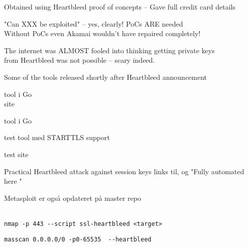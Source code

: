 \documentclass[Screen16to9,17pt]{foils}
\begin{document}
\begin{list2}
\item Obtained using Heartbleed proof of concepts -- Gave full credit card details
\item "Can XXX be exploited" -- yes, clearly! PoCs ARE needed\\
Without PoCs even Akamai wouldn't have repaired completely!
\item The internet was ALMOST fooled into thinking getting private keys\\
 from Heartbleed was not possible -- scary indeed.
\end{list2}


\centerline{Some of the tools released shortly after Heartbleed announcement}
\begin{list2}
\item {} tool i Go\\
site 
\item {} tool i Go
\item {} test tool med STARTTLS support
\item {} test site
\item {} Practical Heartbleed attack against session keys links til,  og "Fully automated here "\\ 

\item Metasploit er også opdateret på master repo\\ \\
\end{list2}




\begin{list1}
\item \verb+nmap -p 443 --script ssl-heartbleed <target>+\\
\item \verb+masscan 0.0.0.0/0 -p0-65535  --heartbleed+\\
\end{list1}
\end{document}
